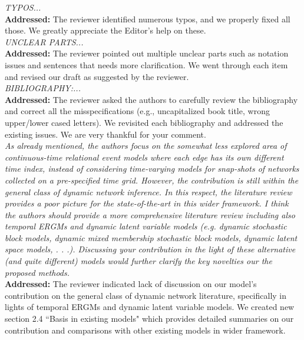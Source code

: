 \documentclass[12pt]{article}
\newcommand{\grey}[1]{{\color{mygrey}#1}}
\theoremstyle{definition}
\begin{document}
 \grey{\emph{ TYPOS...}}\\

\noindent \textcolor{MyGreen}{\textbf{Addressed:}} The reviewer identified numerous typos, and we properly fixed all those. We greatly appreciate the Editor's help on these.\\

 \grey{\emph{UNCLEAR PARTS...}}\\

\noindent \textcolor{MyGreen}{\textbf{Addressed:}} The reviewer pointed out multiple unclear parts such as notation issues and sentences that needs more clarification. We went through each item and revised our draft as suggested by the reviewer. \\


 \grey{\emph{BIBLIOGRAPHY:...}}\\

\noindent \textcolor{MyGreen}{\textbf{Addressed:}} The reviewer asked the authors to carefully review the bibliography and correct all the misspecifications (e.g., uncapitalized book title, wrong upper/lower cased letters). We revisited each bibliography and addressed the existing issues. We are very thankful for your comment.\\


 \grey{\emph{As already mentioned, the authors focus on the somewhat less explored area of continuous-time relational event models where each edge has its own different time index, instead of considering time-varying models for snap-shots of networks collected on a pre-specified time grid. However, the contribution is still within the general class of dynamic network inference. In this respect, the literature review provides a poor picture for the state-of-the-art in this wider framework. I think the authors should provide a more comprehensive literature review including also temporal ERGMs and dynamic latent variable models (e.g. dynamic stochastic block models, dynamic mixed membership stochastic block models, dynamic latent space models, . . .). Discussing your contribution in the light of these alternative (and quite different) models would further clarify the key novelties our the proposed methods.}}\\

\noindent \textcolor{MyGreen}{\textbf{Addressed:}} The reviewer indicated lack of discussion on our model's contribution on the general class of dynamic network literature, specifically in lights of temporal ERGMs and dynamic latent variable models. We created new section 2.4 ``Basis in existing models" which provides detailed summaries on our contribution and comparisons with other existing models in wider framework. \\
\end{document}
